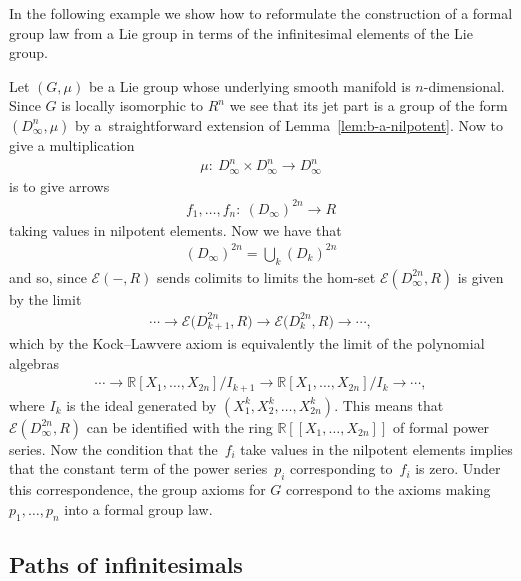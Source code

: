 \documentclass[pdftex]{sigma}
\numberwithin{equation}{section}
\begin{document}
In the following example we show how to reformulate the construction of a formal group law from a Lie group in terms of the inf\/initesimal elements of the Lie group.
\begin{Example}\label{example-04/27/1504:43:57 PM} Let $(G,\mu)$ be a Lie group whose underlying smooth manifold is $n$-dimensional. Since $G$ is locally isomorphic to $R^{n}$ we see that its jet part is a group of the form $(D_{\infty}^{n},\mu)$ by a~straightforward extension of Lemma~\ref{lem:b-a-nilpotent}. Now to give a multiplication
\begin{gather*}\mu\colon \ D_{\infty}^{n}\times D_{\infty}^{n}\rightarrow D_{\infty}^{n}\end{gather*}
is to give arrows
\begin{gather*}f_{1},\dots ,f_{n}\colon \ (D_{\infty})^{2n}\rightarrow R\end{gather*}
taking values in nilpotent elements. Now we have that
\begin{gather*}(D_{\infty})^{2n}=\bigcup_{k}(D_{k})^{2n}\end{gather*}
and so, since $\mathcal{E}(-,R)$ sends colimits to limits the hom-set $\mathcal{E}(D_{\infty}^{2n},R)$ is given by the limit
\begin{gather*}\cdots \rightarrow\mathcal{E}\big(D_{k+1}^{2n},R\big)\rightarrow\mathcal{E}\big(D_{k}^{2n},R\big)\rightarrow \cdots, \end{gather*}
which by the Kock--Lawvere axiom is equivalently the limit of the polynomial algebras
\begin{gather*}\cdots \rightarrow \mathbb{R}[X_{1},\dots ,X_{2n}]/I_{k+1}\rightarrow \mathbb{R}[X_{1},\dots ,X_{2n}]/I_{k}\rightarrow \cdots, \end{gather*}
where $I_{k}$ is the ideal generated by $(X_{1}^{k},X_{2}^{k},\dots ,X_{2n}^{k})$. This means that $\mathcal{E}(D_{\infty}^{2n},R)$ can be identif\/ied with the ring $\mathbb{R}[[X_{1},\dots ,X_{2n}]]$ of formal power series. Now the condition that the~$f_{i}$ take values in the nilpotent elements implies that the constant term of the power series~$p_{i}$ corresponding to~$f_{i}$ is zero. Under this correspondence, the group axioms for $G$ correspond to the axioms making $p_{1},\dots ,p_{n}$ into a formal group law.
\end{Example}

\subsection{Paths of inf\/initesimals}\label{sec:paths-of-infinitesimals}
\end{document}
